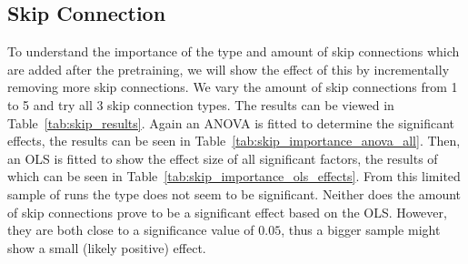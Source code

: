 \subsection{Skip Connection}
To understand the importance of the type and amount of skip connections which are added after the pretraining, we will show the effect of this by incrementally removing more skip connections. We vary the amount of skip connections from 1 to 5 and try all 3 skip connection types. The results can be viewed in Table~\ref{tab:skip_results}.
Again an ANOVA is fitted to determine the significant effects, the results can be seen in Table~\ref{tab:skip_importance_anova_all}. Then, an OLS is fitted to show the effect size of all significant factors, the results of which can be seen in Table~\ref{tab:skip_importance_ols_effects}. From this limited sample of runs the type does not seem to be significant. Neither does the amount of skip connections prove to be a significant effect based on the OLS. However, they are both close to a significance value of $0.05$, thus a bigger sample might show a small (likely positive) effect.




